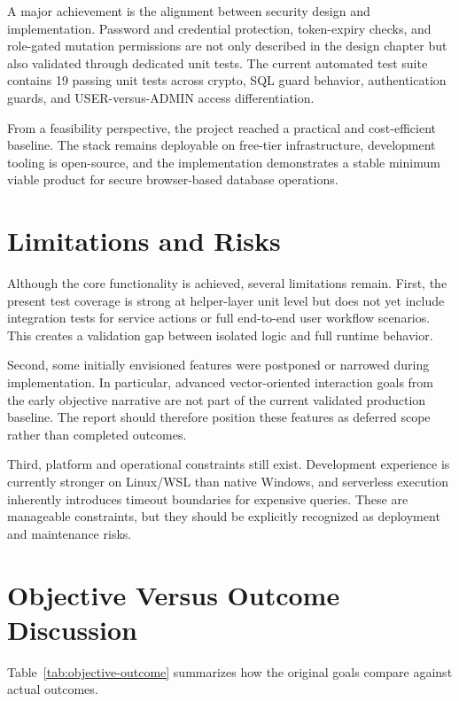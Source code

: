 A major achievement is the alignment between security design and implementation. Password and credential protection, token-expiry checks, and role-gated mutation permissions are not only described in the design chapter but also validated through dedicated unit tests. The current automated test suite contains 19 passing unit tests across crypto, SQL guard behavior, authentication guards, and USER-versus-ADMIN access differentiation.

From a feasibility perspective, the project reached a practical and cost-efficient baseline. The stack remains deployable on free-tier infrastructure, development tooling is open-source, and the implementation demonstrates a stable minimum viable product for secure browser-based database operations.


\section{Limitations and Risks}

Although the core functionality is achieved, several limitations remain. First, the present test coverage is strong at helper-layer unit level but does not yet include integration tests for service actions or full end-to-end user workflow scenarios. This creates a validation gap between isolated logic and full runtime behavior.

Second, some initially envisioned features were postponed or narrowed during implementation. In particular, advanced vector-oriented interaction goals from the early objective narrative are not part of the current validated production baseline. The report should therefore position these features as deferred scope rather than completed outcomes.

Third, platform and operational constraints still exist. Development experience is currently stronger on Linux/WSL than native Windows, and serverless execution inherently introduces timeout boundaries for expensive queries. These are manageable constraints, but they should be explicitly recognized as deployment and maintenance risks.


\section{Objective Versus Outcome Discussion}

Table~\ref{tab:objective-outcome} summarizes how the original goals compare against actual outcomes.


